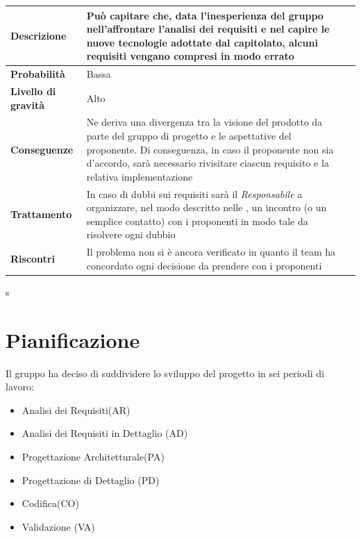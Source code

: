 \begin{center}
	
	\begin{tabular}{|>{\centering}m{4cm} ||>{\centering}m{8cm} |>{\centering\arraybackslash}m{0pt}@{}|}
		\hline
		\textbf{Descrizione} & Può capitare che, data l’inesperienza del gruppo nell’affrontare l’analisi dei requisiti e nel capire le nuove tecnologie adottate dal capitolato, alcuni requisiti vengano compresi in modo errato & \\[2ex]
		\hline	
		\textbf{Probabilità} & Bassa & \\[1ex]
		\hline
		\textbf{Livello di gravità} & Alto & \\[1ex]
		\hline
		\textbf{Conseguenze} & Ne deriva una divergenza tra la visione
		del prodotto da parte del gruppo di progetto e le aspettative del
		proponente. Di conseguenza, in caso il proponente non sia d’accordo,
		sarà necessario rivisitare ciascun requisito e la relativa
		implementazione & \\[1ex]
		\hline
		\textbf{Trattamento} & In caso di dubbi sui requisiti sarà il  \emph{Responsabile}  a organizzare, nel modo descritto nelle \normediprogetto, un incontro (o un semplice contatto) con i proponenti in modo tale da risolvere ogni dubbio & \\[1ex] 
		\hline
		\textbf{Riscontri} & Il problema non si è ancora verificato in quanto il team ha concordato ogni decisione da prendere con i proponenti  & \\[1ex]
		\hline
	\end{tabular}
s	
\end{center}



\section{Pianificazione}
Il gruppo ha deciso di suddividere lo sviluppo del progetto in sei periodi di lavoro:

\begin{itemize}
\item Analisi dei Requisiti(AR)
\item Analisi dei Requisiti in Dettaglio (AD)
\item Progettazione Architetturale(PA)
\item Progettazione di Dettaglio (PD)
\item Codifica(CO)
\item Validazione (VA)
\end{itemize}


